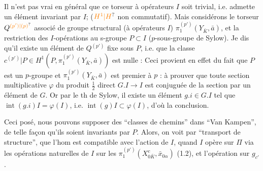 Il n'est pas vrai en général que  ce torseur à opérateurs $I$ soit trivial, i.e. admette un élément invariant par $I$;
($\unsure{H^1|H}$ non commutatif). Mais considérons le  torseur $Q^{\unsure{(p')|(p)}}$ associé de groupe  structural (à opérateurs $I$) $\pi_1^{(p')}(Y_{\bar K},\bar a)$, et la restriction des $I$-opérations au s-groupe $P\subset I$ ($p$-sous-groupe de Sylow). Je dis qu'il existe un élément de $Q^{(p')}$ fixe sous $P$, i.e. que la classe $c^{(p')}|P\in H^1(P,\pi_1^{(p')}(Y_{\bar K},\bar a))$ est nulle : Ceci provient en effet du fait que $P$ est un $p$-groupe et  $\pi_1^{(p')}(Y_{\bar K},\bar a)$ est premier à $p$ : à prouver que  toute section multiplicative $\varphi$ du produit $\frac12$ direct $G.I\to I$ est conjuguée de la section  par un élément de $G$. Or par le th de  Sylow, il existe un élément $g.i\in G.I$ tel que $\operatorname{int}(g.i)I=\varphi(I)$, i.e. $\operatorname{int}(g)I\subset\varphi(I)$, d'où la conclusion.

Ceci posé, nous pouvons supposer  des ``classes de chemins'' dans  ``Van Kampen'',   de telle façon qu'ils soient invariants par $P$.  Alors, on voit par ``transport de structure'', que  l'hom
est compatible avec l'action de $I$, quand $I$ opère sur $\Pi$ via les opérations naturelles de $I$ sur les $\pi_1^{(p')}(X^c_{0\bar K},\bar x_{0\alpha})$ (1.2), et l'opération \uline{} sur  $g_{c'}$.

